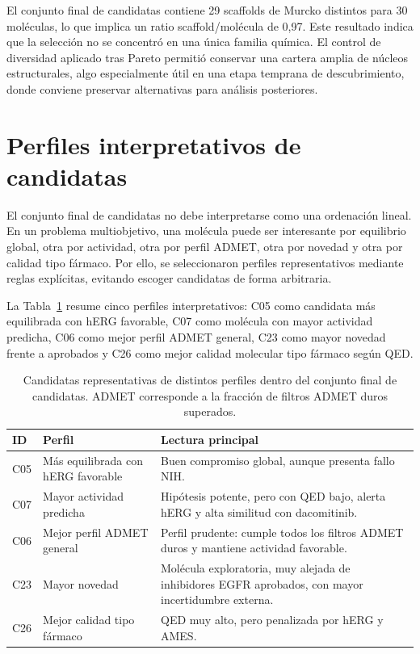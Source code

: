 \documentclass[IB]{TFUOC}%
\begin{document}
El conjunto final de candidatas contiene 29 scaffolds de Murcko distintos para 30 moléculas, lo que implica un ratio scaffold/molécula de 0,97. Este resultado indica que la selección no se concentró en una única familia química. El control de diversidad aplicado tras Pareto permitió conservar una cartera amplia de núcleos estructurales, algo especialmente útil en una etapa temprana de descubrimiento, donde conviene preservar alternativas para análisis posteriores.

\section{Perfiles interpretativos de candidatas}

El conjunto final de candidatas no debe interpretarse como una ordenación lineal. En un problema multiobjetivo, una molécula puede ser interesante por equilibrio global, otra por actividad, otra por perfil ADMET, otra por novedad y otra por calidad tipo fármaco. Por ello, se seleccionaron perfiles representativos mediante reglas explícitas, evitando escoger candidatas de forma arbitraria.

La Tabla~\ref{tab:perfiles_candidatas_resultados} resume cinco perfiles interpretativos: C05 como candidata más equilibrada con hERG favorable, C07 como molécula con mayor actividad predicha, C06 como mejor perfil ADMET general, C23 como mayor novedad frente a aprobados y C26 como mejor calidad molecular tipo fármaco según QED.

\begin{table}[H]
    \centering
    \small
    \renewcommand{\arraystretch}{1.35}
    \begin{tabular}{p{1cm} p{5cm} p{10cm}}
        \hline
        \textbf{ID} & \textbf{Perfil} & \textbf{Lectura principal} \\
        \hline
        C05 & Más equilibrada con hERG favorable & Buen compromiso global, aunque presenta fallo NIH. \\

        C07 & Mayor actividad predicha & Hipótesis potente, pero con QED bajo, alerta hERG y alta similitud con dacomitinib. \\

        C06 & Mejor perfil ADMET general & Perfil prudente: cumple todos los filtros ADMET duros y mantiene actividad favorable. \\

        C23 & Mayor novedad & Molécula exploratoria, muy alejada de inhibidores EGFR aprobados, con mayor incertidumbre externa. \\

        C26 & Mejor calidad tipo fármaco & QED muy alto, pero penalizada por hERG y AMES. \\
        \hline
    \end{tabular}
    \caption{Candidatas representativas de distintos perfiles dentro del conjunto final de candidatas. ADMET corresponde a la fracción de filtros ADMET duros superados.}
    \label{tab:perfiles_candidatas_resultados}
\end{table}
\end{document}
